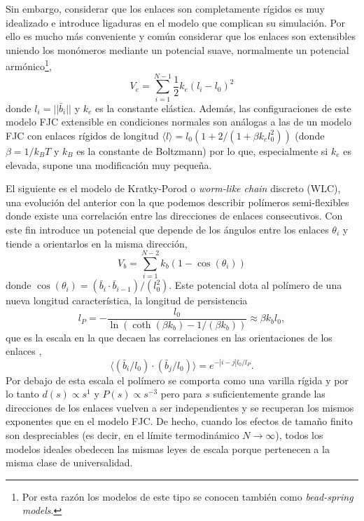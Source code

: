Sin embargo, considerar que los enlaces son completamente rígidos es muy idealizado e introduce ligaduras en el modelo que complican su simulación. Por ello es mucho más conveniente y común considerar que los enlaces son extensibles uniendo los monómeros mediante un potencial suave, normalmente un potencial armónico\footnote{Por esta razón los modelos de este tipo se conocen también como \textit{bead-spring models}.},
\begin{equation}
    \label{eq:Harmonic_Potential}
    V_e=\sum_{i=1}^{N-1}\frac{1}{2}k_e(l_i-l_0)^2
\end{equation}
donde $l_i=||\bar{b}_i||$ y $k_e$ es la constante elástica. Además, las configuraciones de este modelo FJC extensible \cite{Fiasconaro2019} en condiciones normales son análogas a las de un modelo FJC con enlaces rígidos de longitud $\langle l \rangle=l_0(1+2/(1+\beta k_e l_0^2))$ (donde $\beta=1/k_BT$ y $k_B$ es la constante de Boltzmann) por lo que, especialmente si $k_e$ es elevada, supone una modificación muy pequeña.

El siguiente es el modelo de Kratky-Porod o \textit{worm-like chain} discreto (WLC), una evolución del anterior con la que podemos describir polímeros semi-flexibles donde existe una correlación entre las direcciones de enlaces consecutivos. Con este fin introduce un potencial que depende de los ángulos entre los enlaces $\theta_i$ y tiende a orientarlos en la misma dirección,
\begin{equation}
    \label{eq:Bending_Potential}
    V_b=\sum_{i=1}^{N-2} k_b (1-\cos(\theta_i))
\end{equation}
donde $\cos(\theta_i)=(\bar{b}_i\cdot\bar{b}_{i-1})/(l_0^2)$. Este potencial dota al polímero de una nueva longitud característica, la longitud de persistencia
\begin{equation}
    \label{eq:WLC_persistence_length}
    l_P=-\frac{l_0}{\ln(\coth(\beta k_b)-1/(\beta k_b))}\approx\beta k_bl_0,
\end{equation}
que es la escala en la que decaen las correlaciones en las orientaciones de los enlaces \cite{Theodorakopoulos2019},
\begin{equation}
    \label{eq:WLC_direction_correlation}
    \langle (\bar{b}_i/l_0)\cdot(\bar{b}_j/l_0) \rangle=e^{-|i-j|l_0/l_P}.
\end{equation}
Por debajo de esta escala el polímero se comporta como una varilla rígida y por lo tanto $d(s)\propto s^{1}$ y $P(s)\propto s^{-3}$ pero para $s$ suficientemente grande las direcciones de los enlaces vuelven a ser independientes y se recuperan los mismos exponentes que en el modelo FJC. De hecho, cuando los efectos de tamaño finito son despreciables (es decir, en el límite termodinámico $N\to\infty$), todos los modelos ideales obedecen las mismas leyes de escala porque pertenecen a la misma clase de universalidad.

